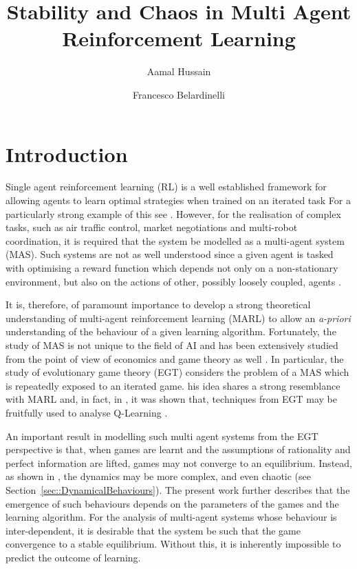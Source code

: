 \documentclass[sigconf,anonymous]{aamas}
\title[InstabilityinMARL]{Stability and Chaos in Multi Agent Reinforcement Learning}
\author{Aamal Hussain}
\affiliation{
  \department{Department of Computing}
  \institution{Imperial College London}}
\author{Francesco Belardinelli}
\affiliation{
  \department{Department of Computing}
  \institution{Imperial College London}}
\begin{document}

\pagestyle{fancy}
\fancyhead{}


\maketitle 


\section{Introduction}

Single agent reinforcement learning (RL) is a well established framework for allowing agents to learn optimal strategies when trained on an iterated task 
For a particularly strong example of this see \cite{Vinyals2019}. However, for the realisation of complex tasks, such as air traffic control, market negotiations and multi-robot coordination, it is required that the system be modelled as a multi-agent system (MAS). Such systems are not as well understood since a given agent is tasked with optimising a reward function which depends not only on a non-stationary environment, but also on the actions of other, possibly loosely coupled, agents \cite{SchwartzMulti-agentApproach}. 

It is, therefore, of paramount importance to develop a strong theoretical understanding of multi-agent reinforcement learning (MARL) to allow an {\em a-priori} understanding of the behaviour of a given learning algorithm. Fortunately, the study of MAS is not unique to the field of AI and has been extensively studied from the point of view of economics and game theory as well \cite{ShohamMultiagentFoundations}. In particular, the study of evolutionary game theory (EGT) considers the problem of a MAS which is repeatedly exposed to an iterated game. 
his idea shares a strong resemblance with MARL and, in fact, in \cite{Tuyls2006AnGames}, it was shown that, techniques from EGT may be fruitfully used to analyse Q-Learning \cite{Sutton2018}.

An important result in modelling such multi agent systems from the EGT perspective is that, when games are learnt and the assumptions of rationality and perfect information are lifted, games may not converge to an equilibrium. Instead, as shown in \cite{Sanders2018}, the dynamics may be more complex, and even chaotic (see Section~\ref{sec::DynamicalBehaviours}). The present work further describes that the emergence of such behaviours depends on the parameters of the games and the learning algorithm. For the analysis of multi-agent systems whose behaviour is inter-dependent, it is desirable that the system be such that the game convergence to a stable equilibrium. Without this, it is inherently impossible to predict the outcome of learning.  
\end{document}
